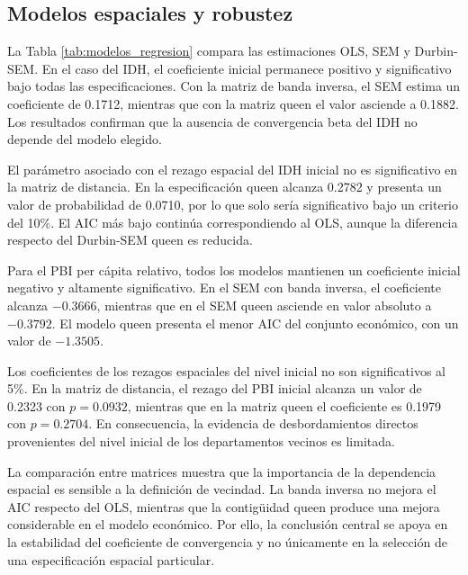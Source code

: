 \subsection{Modelos espaciales y robustez}

La Tabla \ref{tab:modelos_regresion} compara las estimaciones OLS, SEM y
Durbin-SEM. En el caso del IDH, el coeficiente inicial permanece positivo y
significativo bajo todas las especificaciones. Con la matriz de banda inversa,
el SEM estima un coeficiente de 0.1712, mientras que con la matriz queen el
valor asciende a 0.1882. Los resultados confirman que la ausencia de
convergencia beta del IDH no depende del modelo elegido.

El parámetro asociado con el rezago espacial del IDH inicial no es
significativo en la matriz de distancia. En la especificación queen alcanza
0.2782 y presenta un valor de probabilidad de 0.0710, por lo que solo sería
significativo bajo un criterio del 10\%. El AIC más bajo continúa
correspondiendo al OLS, aunque la diferencia respecto del Durbin-SEM queen es
reducida.

Para el PBI per cápita relativo, todos los modelos mantienen un coeficiente
inicial negativo y altamente significativo. En el SEM con banda inversa, el
coeficiente alcanza $-0.3666$, mientras que en el SEM queen asciende en valor
absoluto a $-0.3792$. El modelo queen presenta el menor AIC del conjunto
económico, con un valor de $-1.3505$.

Los coeficientes de los rezagos espaciales del nivel inicial no son
significativos al 5\%. En la matriz de distancia, el rezago del PBI inicial
alcanza un valor de 0.2323 con $p=0.0932$, mientras que en la matriz queen el
coeficiente es 0.1979 con $p=0.2704$. En consecuencia, la evidencia de
desbordamientos directos provenientes del nivel inicial de los departamentos
vecinos es limitada.

La comparación entre matrices muestra que la importancia de la dependencia
espacial es sensible a la definición de vecindad. La banda inversa no mejora el
AIC respecto del OLS, mientras que la contigüidad queen produce una mejora
considerable en el modelo económico. Por ello, la conclusión central se apoya
en la estabilidad del coeficiente de convergencia y no únicamente en la
selección de una especificación espacial particular.

